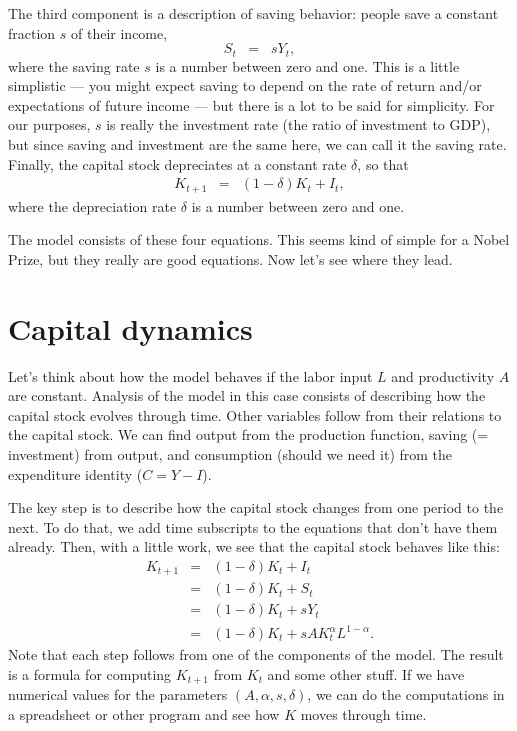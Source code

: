 The third component is a description of saving behavior:
people save a constant fraction $s$ of their income,
\[
    S_t \;\;=\;\; sY_t,
\]
where the saving rate $s$ is a number between zero and one.
This is a little simplistic --- you might expect saving to depend on
the rate of return and/or expectations of future income --- but there is a lot to be said for simplicity.
For our purposes, $s$ is really the investment rate (the ratio of
investment to GDP), but since saving and investment are the same
here, we can call it the saving rate.
Finally, the capital stock depreciates at a constant rate $\delta$,
so that
\begin{eqnarray}
    K_{t+1} &=& (1-\delta) K_t + I_t ,
    \label{eq:k}
\end{eqnarray}
where the depreciation rate $\delta$ is a number between zero and one.


The model consists of these four equations.
This seems kind of simple for a Nobel Prize, but they really are good equations.
Now let's see where they lead.


\section{Capital dynamics}
%
Let's think about how the model behaves if the labor input $L$
and productivity $A$ are constant.
Analysis of the model in this case consists of describing
how the capital stock evolves through time.
Other variables follow from their relations to the capital stock.
We can find output from the production function,
saving (= investment) from output,
and consumption (should we need it) from the expenditure identity ($ C = Y - I$).

The key step is to describe how the capital stock changes from one period to the next.
To do that, we add time subscripts to the equations that don't have them already.
Then, with a little work, we see that the capital stock behaves like this:
\begin{eqnarray}
    K_{t+1} &=& (1-\delta) K_t + I_t \nonumber \\
            &=& (1-\delta) K_t + S_t \nonumber  \\
            &=& (1-\delta) K_t + s Y_t \nonumber \\
            &=& (1-\delta) K_t + s A K_t^\alpha L^{1-\alpha} .
            \label{eq:k-lom}
\end{eqnarray}
Note that each step follows from one of the components of the model.
The result is a formula for computing $K_{t+1}$ from $K_t$ and some other stuff.
If we have numerical values for the parameters $(A,\alpha,s,\delta)$,
we can do the computations in a spreadsheet or other program
and see how $K$ moves through time.


